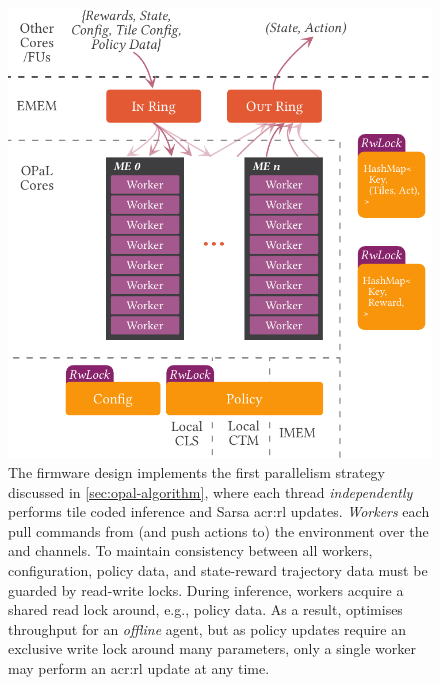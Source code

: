 \begin{figure}
	\centering
	\includegraphics[keepaspectratio, width=\linewidth]{diagrams/opal/ind}
	\caption[Architectural diagram for \approachshort{}'s \Indfw{} firmware design.]{The \Indfw{} firmware design implements the first parallelism strategy discussed in \cref{sec:opal-algorithm}, where each thread \emph{independently} performs tile coded inference and Sarsa \gls{acr:rl} updates. \emph{Workers} each pull commands from (and push actions to) the environment over the \inring{} and \outring{} channels. To maintain consistency between all workers, configuration, policy data, and state-reward trajectory data must be guarded by read-write locks. During inference, workers acquire a shared read lock around, e.g., policy data. As a result, \Indfw{} optimises throughput for an \emph{offline} agent, but as policy updates require an exclusive write lock around many parameters, only a single worker may perform an \gls{acr:rl} update at any time.\label{fig:single-and-parallel:single}}
\end{figure}
